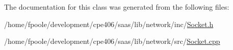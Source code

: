 The documentation for this class was generated from the following files\+:\begin{DoxyCompactItemize}
\item 
/home/fpoole/development/cpe406/saas/lib/network/inc/\hyperlink{_socket_8h}{Socket.\+h}\item 
/home/fpoole/development/cpe406/saas/lib/network/src/\hyperlink{_socket_8cpp}{Socket.\+cpp}\end{DoxyCompactItemize}
